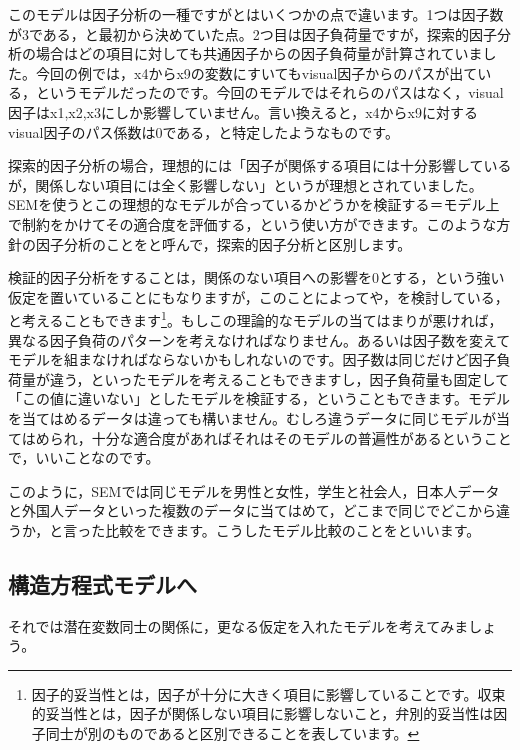 \documentclass{ltjsbook}
\begin{document}
このモデルは因子分析の一種ですがとはいくつかの点で違います。1つは因子数が3である，と最初から決めていた点。2つ目は因子負荷量ですが，探索的因子分析の場合はどの項目に対しても共通因子からの因子負荷量が計算されていました。今回の例では，x4からx9の変数にすいてもvisual因子からのパスが出ている，というモデルだったのです。今回のモデルではそれらのパスはなく，visual因子はx1,x2,x3にしか影響していません。言い換えると，x4からx9に対するvisual因子のパス係数は0である，と特定したようなものです。

探索的因子分析の場合，理想的には「因子が関係する項目には十分影響しているが，関係しない項目には全く影響しない」というが理想とされていました。SEMを使うとこの理想的なモデルが合っているかどうかを検証する＝モデル上で制約をかけてその適合度を評価する，という使い方ができます。このような方針の因子分析のことをと呼んで，探索的因子分析と区別します。

検証的因子分析をすることは，関係のない項目への影響を0とする，という強い仮定を置いていることにもなりますが，このことによってや，を検討している，と考えることもできます\footnote{因子的妥当性とは，因子が十分に大きく項目に影響していることです。収束的妥当性とは，因子が関係しない項目に影響しないこと，弁別的妥当性は因子同士が別のものであると区別できることを表しています。}。もしこの理論的なモデルの当てはまりが悪ければ，異なる因子負荷のパターンを考えなければなりません。あるいは因子数を変えてモデルを組まなければならないかもしれないのです。因子数は同じだけど因子負荷量が違う，といったモデルを考えることもできますし，因子負荷量も固定して「この値に違いない」としたモデルを検証する，ということもできます。モデルを当てはめるデータは違っても構いません。むしろ違うデータに同じモデルが当てはめられ，十分な適合度があればそれはそのモデルの普遍性があるということで，いいことなのです。

このように，SEMでは同じモデルを男性と女性，学生と社会人，日本人データと外国人データといった複数のデータに当てはめて，どこまで同じでどこから違うか，と言った比較をできます。こうしたモデル比較のことをといいます。

\subsection{構造方程式モデルへ}
それでは潜在変数同士の関係に，更なる仮定を入れたモデルを考えてみましょう。
\end{document}
